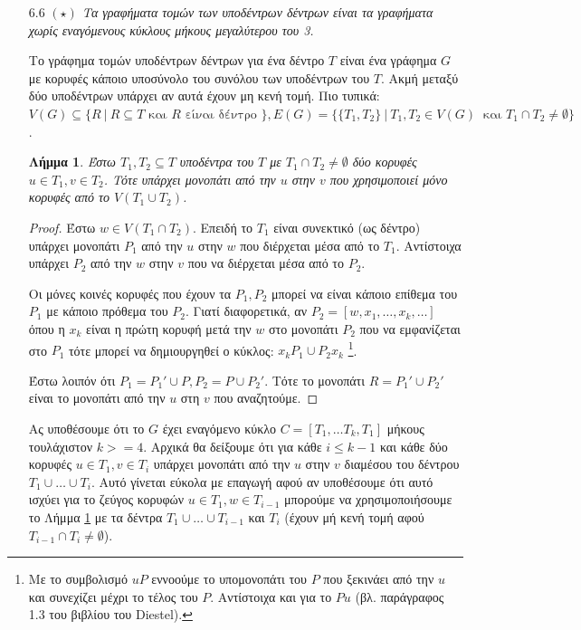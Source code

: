 \documentclass[a4paper, oneside, 11pt]{article}
\newtheorem{lm}[thm]{Λήμμα}
\theoremstyle{definition}
\begin{document}
\begin{enumerate}
   \item[6.6] \emph{$(\star)$ Τα γραφήματα τομών των υποδέντρων
   δέντρων είναι τα γραφήματα χωρίς εναγόμενους κύκλους μήκους μεγαλύτερου
   του 3.}

   Το γράφημα τομών υποδέντρων δέντρων για ένα δέντρο $T$ είναι ένα
   γράφημα $G$ με κορυφές κάποιο υποσύνολο του συνόλου των υποδέντρων του
   $T$. Ακμή
   μεταξύ δύο υποδέντρων υπάρχει αν αυτά έχουν μη κενή τομή.
   Πιο τυπικά: $V(G) \subseteq \{ R\ |\ R \subseteq T \text{ και }
   R \text{ είναι δέντρο } \}, E(G) = \{ \{T_1, T_2\}\ |\ T_1, T_2 \in V(G)\
   \text{ και } T_1 \cap T_2 \neq \emptyset \}$.

   \begin{lm}
      \label{lm6.6.1}
      Έστω $T_1, T_2 \subseteq T$ υποδέντρα του $T$ με $T_1 \cap T_2 \neq
      \emptyset$ δύο κορυφές $u \in T_1, v \in T_2$. Τότε υπάρχει μονοπάτι
      από την $u$ στην $v$ που χρησιμοποιεί μόνο κορυφές από το
      $V(T_1 \cup T_2)$.
   \end{lm}
   \begin{proof}
      Έστω $w \in V(T_1 \cap T_2)$. Επειδή το $T_1$ είναι συνεκτικό (ως δέντρο)
      υπάρχει μονοπάτι $P_1$ από την $u$ στην $w$ που διέρχεται μέσα
      από το $T_1$. Αντίστοιχα υπάρχει $P_2$ από την $w$ στην $v$
      που να διέρχεται μέσα από το $P_2$.

      Οι μόνες κοινές κορυφές που έχουν τα $P_1, P_2$ μπορεί να είναι
      κάποιο επίθεμα του $P_1$ με κάποιο πρόθεμα του $P_2$.
      Γιατί διαφορετικά, αν $P_2 = [w, x_1, \ldots, x_k, \ldots]$
      όπου η $x_k$ είναι η πρώτη κορυφή μετά την $w$ στο μονοπάτι
      $P_2$ που να εμφανίζεται στο $P_1$ τότε μπορεί να δημιουργηθεί
      ο κύκλος: $x_kP_1 \cup P_2x_k$ \footnote{Με το συμβολισμό
      $uP$ εννοούμε το υπομονοπάτι του $P$ που ξεκινάει από την $u$
      και συνεχίζει μέχρι το τέλος του $P$. Αντίστοιχα και για το $Pu$
      (βλ. παράγραφος 1.3 του βιβλίου του Diestel).}.

      Έστω λοιπόν ότι $P_1 = P_1' \cup P, P_2 = P \cup P_2'$.
      Τότε το μονοπάτι $R = P_1' \cup P_2'$ είναι το μονοπάτι
      από την $u$ στη $v$ που αναζητούμε.
   \end{proof}

   Ας υποθέσουμε ότι το $G$ έχει εναγόμενο κύκλο $C = [T_1, \ldots T_{k},
   T_1]$ μήκους τουλάχιστον $k >= 4$. Αρχικά θα δείξουμε ότι για κάθε
   $i \leq k-1$ και κάθε δύο κορυφές $u \in T_1, v \in T_i$ υπάρχει
   μονοπάτι από την $u$ στην $v$ διαμέσου του δέντρου $T_1 \cup \ldots \cup
   T_i$. Αυτό γίνεται εύκολα με επαγωγή αφού αν υποθέσουμε
   ότι αυτό ισχύει για το ζεύγος κορυφών $u \in T_1, w \in T_{i-1}$
   μπορούμε να χρησιμοποιήσουμε το Λήμμα \ref{lm6.6.1} με τα δέντρα
   $T_1 \cup \ldots \cup T_{i-1}$ και $T_i$ (έχουν μή κενή τομή αφού
   $T_{i-1} \cap T_i \neq \emptyset$).


\end{enumerate}
\end{document}

